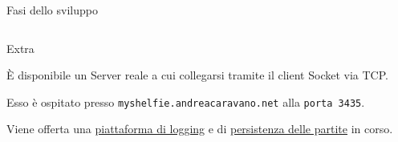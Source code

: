\documentclass[aspectratio=1610,10.5pt]{beamer} %
\begin{document}
\begin{frame}{Fasi dello sviluppo}
\begin{columns}
\begin{column}{0.4\textwidth}
\begin{block}{Extra}
                {\small È disponibile un Server reale a cui collegarsi tramite il client Socket via TCP.\par}
                    \hfill \linebreak
                    {\small Esso è ospitato presso \texttt{myshelfie.andreacaravano.net} alla \texttt{porta 3435}.\par}
                    \hfill \linebreak
                    {\small Viene offerta una \href{http://myshelfie.andreacaravano.net/log/}{piattaforma di logging} e di \href{http://myshelfie.andreacaravano.net/games-persistency/}{persistenza delle partite} in corso.\par}
                \end{block}
            \end{column}
        \end{columns}
    \end{frame}
\end{document}
